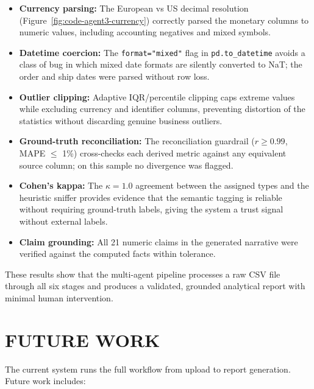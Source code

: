 \documentclass[12pt,a4paper,openany]{report}
\begin{document}
\begin{itemize}
	\item \textbf{Currency parsing:} The European vs US decimal resolution (Figure~\ref{fig:code-agent3-currency}) correctly parsed the monetary columns to numeric values, including accounting negatives and mixed symbols.
	\item \textbf{Datetime coercion:} The \texttt{format="mixed"} flag in \texttt{pd.to\_datetime} avoids a class of bug in which mixed date formats are silently converted to NaT; the order and ship dates were parsed without row loss.
	\item \textbf{Outlier clipping:} Adaptive IQR/percentile clipping caps extreme values while excluding currency and identifier columns, preventing distortion of the statistics without discarding genuine business outliers.
	\item \textbf{Ground-truth reconciliation:} The reconciliation guardrail ($r \ge 0.99$, MAPE $\le$ 1\%) cross-checks each derived metric against any equivalent source column; on this sample no divergence was flagged.
	\item \textbf{Cohen's kappa:} The $\kappa=1.0$ agreement between the assigned types and the heuristic sniffer provides evidence that the semantic tagging is reliable without requiring ground-truth labels, giving the system a trust signal without external labels.
	\item \textbf{Claim grounding:} All 21 numeric claims in the generated narrative were verified against the computed facts within tolerance.
\end{itemize}

These results show that the multi-agent pipeline processes a raw CSV file through all six stages and produces a validated, grounded analytical report with minimal human intervention.

\chapter{FUTURE WORK}

The current system runs the full workflow from upload to report generation. Future work includes:
\end{document}
